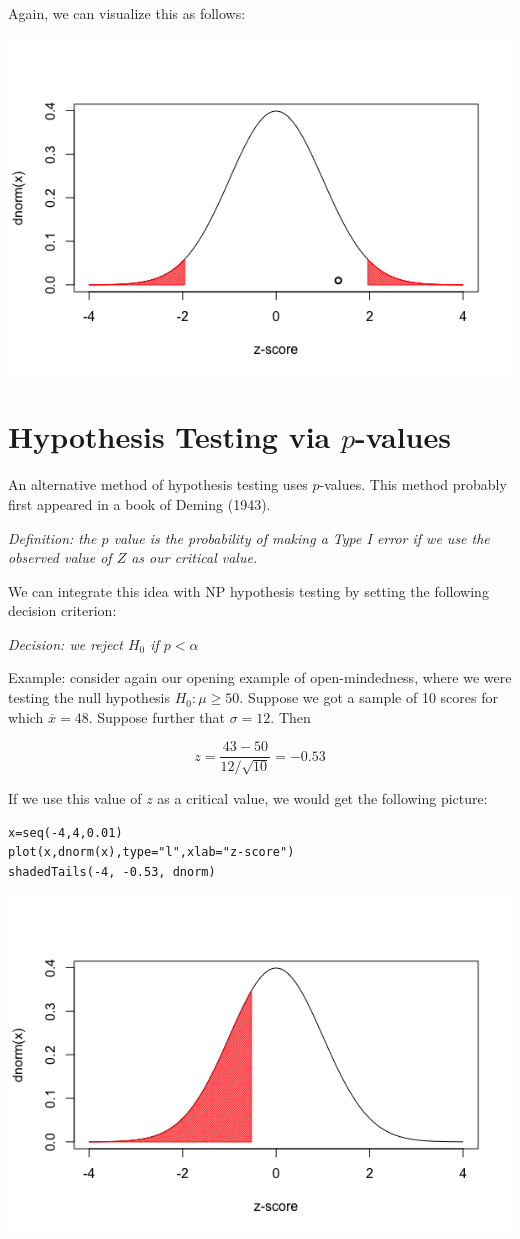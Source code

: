 \documentclass[11pt]{article}
\begin{document}
Again, we can visualize this as follows:

\includegraphics[width=.9\linewidth]{figures/week4/example3.png}
\section*{Hypothesis Testing via $p$-values}
\label{sec-2}

An alternative method of hypothesis testing uses $p$-values.  This method probably first appeared in a book of Deming (1943). 

\emph{Definition: the $p$ value is the probability of making a Type I error if we use the observed value of $Z$ as our critical value.}

We can integrate this idea with NP hypothesis testing by setting the following decision criterion:

\emph{Decision: we reject $H_0$ if $p<\alpha$}

Example: consider again our opening example of open-mindedness, where we were testing the null hypothesis $H_0:\mu\geq 50$.  Suppose we got a sample of 10 scores for which $\overline{x}=48$.  Suppose further that $\sigma=12$.  Then

\[
z=\frac{43-50}{12/\sqrt{10}} = -0.53
\]

If we use this value of $z$ as a critical value, we would get the following picture:

\begin{verbatim}
x=seq(-4,4,0.01)
plot(x,dnorm(x),type="l",xlab="z-score")
shadedTails(-4, -0.53, dnorm)
\end{verbatim}

\includegraphics[width=.9\linewidth]{figures/week4/pValue.png}
\end{document}
